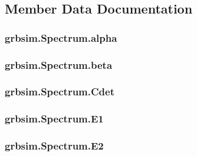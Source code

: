 \subsection{Member Data Documentation}
\hypertarget{classgrbsim_1_1_spectrum_ac49f98a702d92ff88e7246054c499155}{
\subsubsection[{alpha}]{\setlength{\rightskip}{0pt plus 5cm}grbsim.\-Spectrum.\-alpha}}\label{classgrbsim_1_1_spectrum_ac49f98a702d92ff88e7246054c499155}
\hypertarget{classgrbsim_1_1_spectrum_a27416e9bb05f72bffd0fb0a62e0351e4}{
\subsubsection[{beta}]{\setlength{\rightskip}{0pt plus 5cm}grbsim.\-Spectrum.\-beta}}\label{classgrbsim_1_1_spectrum_a27416e9bb05f72bffd0fb0a62e0351e4}
\hypertarget{classgrbsim_1_1_spectrum_a7235dfb6df1f5c3d4dde63df75a42a96}{
\subsubsection[{Cdet}]{\setlength{\rightskip}{0pt plus 5cm}grbsim.\-Spectrum.\-Cdet}}\label{classgrbsim_1_1_spectrum_a7235dfb6df1f5c3d4dde63df75a42a96}
\hypertarget{classgrbsim_1_1_spectrum_a6c5990e37a514e33cf05745e1e0b4eea}{
\subsubsection[{E1}]{\setlength{\rightskip}{0pt plus 5cm}grbsim.\-Spectrum.\-E1}}\label{classgrbsim_1_1_spectrum_a6c5990e37a514e33cf05745e1e0b4eea}
\hypertarget{classgrbsim_1_1_spectrum_abfe196b528e8b0e5b9cc97df1b82e9a5}{
\subsubsection[{E2}]{\setlength{\rightskip}{0pt plus 5cm}grbsim.\-Spectrum.\-E2}}\label{classgrbsim_1_1_spectrum_abfe196b528e8b0e5b9cc97df1b82e9a5}
